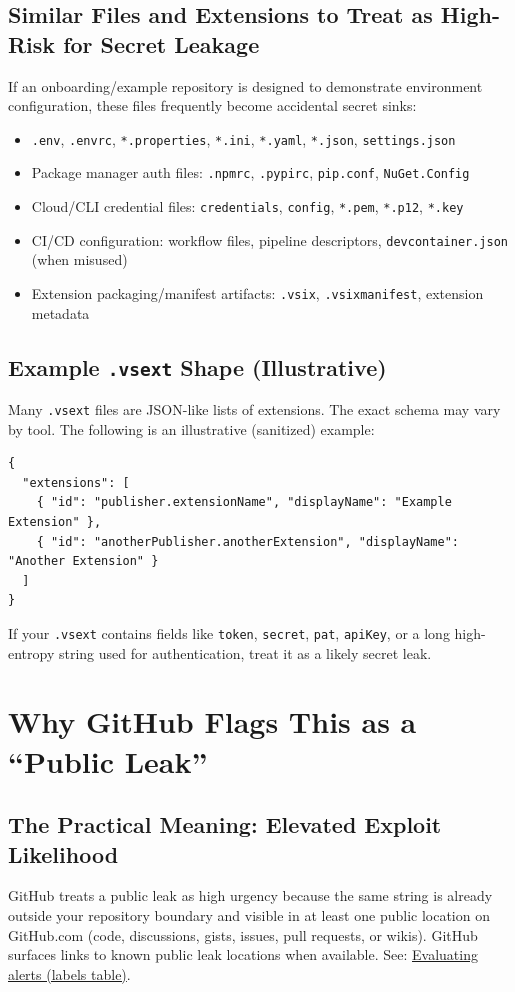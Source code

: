 \documentclass[11pt]{article}
\newcommand{\code}[1]{\texttt{#1}}
\begin{document}
\subsection{Similar Files and Extensions to Treat as High-Risk for Secret Leakage}
If an onboarding/example repository is designed to demonstrate environment configuration, these files frequently become accidental secret sinks:
\begin{itemize}
  \item \code{.env}, \code{.envrc}, \code{*.properties}, \code{*.ini}, \code{*.yaml}, \code{*.json}, \code{settings.json}
  \item Package manager auth files: \code{.npmrc}, \code{.pypirc}, \code{pip.conf}, \code{NuGet.Config}
  \item Cloud/CLI credential files: \code{credentials}, \code{config}, \code{*.pem}, \code{*.p12}, \code{*.key}
  \item CI/CD configuration: workflow files, pipeline descriptors, \code{devcontainer.json} (when misused)
  \item Extension packaging/manifest artifacts: \code{.vsix}, \code{.vsixmanifest}, extension metadata
\end{itemize}

\subsection{Example \code{.vsext} Shape (Illustrative)}
Many \code{.vsext} files are JSON-like lists of extensions. The exact schema may vary by tool. The following is an illustrative (sanitized) example:
\begin{verbatim}
{
  "extensions": [
    { "id": "publisher.extensionName", "displayName": "Example Extension" },
    { "id": "anotherPublisher.anotherExtension", "displayName": "Another Extension" }
  ]
}
\end{verbatim}
If your \code{.vsext} contains fields like \code{token}, \code{secret}, \code{pat}, \code{apiKey}, or a long high-entropy string used for authentication, treat it as a likely secret leak.

\section{Why GitHub Flags This as a ``Public Leak''}
\subsection{The Practical Meaning: Elevated Exploit Likelihood}
GitHub treats a public leak as high urgency because the same string is already outside your repository boundary and visible in at least one public location on GitHub.com (code, discussions, gists, issues, pull requests, or wikis). GitHub surfaces links to known public leak locations when available. See: \href{https://docs.github.com/en/enterprise-cloud@latest/code-security/tutorials/remediate-leaked-secrets/evaluating-alerts}{Evaluating alerts (labels table)}.
\end{document}
